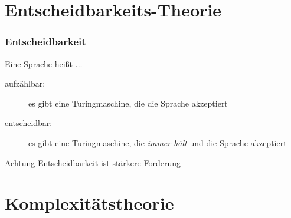 \section{Entscheidbarkeits-Theorie}
\begin{frame}
	\frametitle{Entscheidbarkeit}
	\begin{exampleblock}{}
    Eine Sprache heißt $\dots$
		\begin{description}
			\item[aufzählbar:] es gibt eine Turingmaschine, die die Sprache akzeptiert
			\item [entscheidbar:] es gibt eine Turingmaschine, die \emph{immer hält} und die Sprache akzeptiert
		\end{description}
	\end{exampleblock}
	\begin{alertblock}{Achtung}
		Entscheidbarkeit ist stärkere Forderung
	\end{alertblock}
\end{frame}

\section{Komplexitätstheorie}
